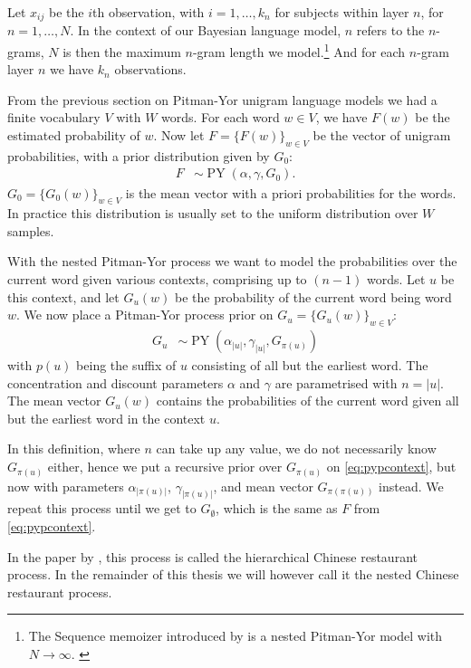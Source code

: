 Let $x_{ij}$ be the $i$th observation, with $i = 1,\ldots,k_n$ for subjects within layer $n$, for $n=1,\ldots,N$. In the context of our Bayesian language model, $n$ refers to the $n$-grams, $N$ is then the maximum $n$-gram length we model.\footnote{The Sequence memoizer introduced by \citet{Wood2009A} is a nested Pitman-Yor model with $N\rightarrow\infty$. \cite{Wood2009A}} And for each $n$-gram layer $n$ we have $k_n$ observations.

From the previous section on Pitman-Yor unigram language models we had a finite vocabulary $V$ with $W$ words. For each word $w\in V$, we have $F(w)$ be the estimated probability of $w$. Now let $F=\{F(w)\}_{w\in V}$ be the vector of unigram probabilities, with a prior distribution given by $G_0$: 
\begin{align}\label{eq:pypcontext}
	F&\sim\operatorname{PY}(\alpha, \gamma, G_0).
\end{align}
$G_0=\{G_0(w)\}_{w\in V}$ is the mean vector with a priori probabilities for the words. In practice this distribution is usually set to the uniform distribution over $W$ samples. 

With the nested Pitman-Yor process we want to model the probabilities over the current word given various contexts, comprising up to $(n-1)$ words. Let $u$ be this context, and let $G_u(w)$ be the probability of the current word being word $w$. We now place a Pitman-Yor process prior on $G_u = \{G_u(w)\}_{w\in V}$:
\begin{align}\label{eq:npypcontext}
	G_u&\sim\operatorname{PY}(\alpha_{|u|},\gamma_{|u|},G_{\pi(u)})
\end{align}
with $p(u)$ being the suffix of $u$ consisting of all but the earliest word. The concentration and discount parameters $\alpha$ and $\gamma$ are parametrised with $n = |u|$. The mean vector $G_u(w)$ contains the probabilities of the current word given all but the earliest word in the context $u$.

In this definition, where $n$ can take up any value, we do not necessarily know $G_{\pi(u)}$ either, hence we put a recursive prior over $G_{\pi(u)}$ on \cref{eq:pypcontext}, but now with parameters $\alpha_{|\pi(u)|}$, $\gamma_{|\pi(u)|}$, and mean vector $G_{\pi(\pi(u))}$ instead. We repeat this process until we get to $G_\emptyset$, which is the same as $F$ from \cref{eq:pypcontext}.

In the paper by \textcite{Teh2006ATechnical}, this process is called the hierarchical Chinese restaurant process. In the remainder of this thesis we will however call it the nested Chinese restaurant process. 

